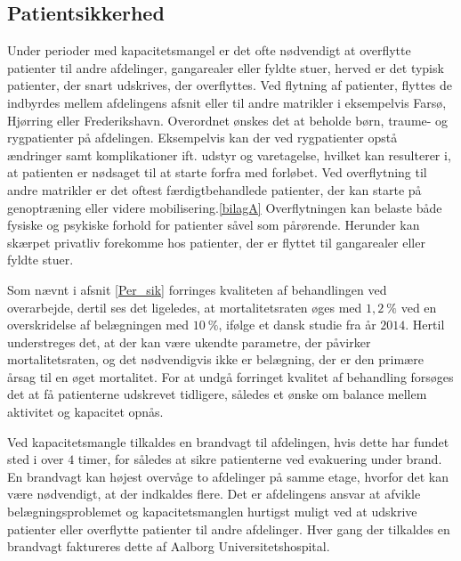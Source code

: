 \subsection{Patientsikkerhed}\label{patsik}
Under perioder med kapacitetsmangel er det ofte nødvendigt at overflytte patienter til andre afdelinger, gangarealer eller fyldte stuer, herved er det typisk patienter, der snart udskrives, der overflyttes. Ved flytning af patienter, flyttes de indbyrdes mellem afdelingens afsnit eller til andre matrikler i eksempelvis Farsø, Hjørring eller Frederikshavn. Overordnet ønskes det at beholde børn, traume- og rygpatienter på afdelingen. Eksempelvis kan der ved rygpatienter opstå ændringer samt komplikationer ift. udstyr og varetagelse, hvilket kan resulterer i, at patienten er nødsaget til at starte forfra med forløbet. Ved overflytning til andre matrikler er det oftest færdigtbehandlede patienter, der kan starte på genoptræning eller videre mobilisering.\ref{bilagA} Overflytningen kan belaste både fysiske og psykiske forhold for patienter såvel som pårørende\cite{Heidmann2014}. Herunder kan skærpet privatliv forekomme hos patienter, der er flyttet til gangarealer eller fyldte stuer\cite{Madsen2014}. 

Som nævnt i afsnit \ref{Per_sik} forringes kvaliteten af behandlingen ved overarbejde, dertil ses det ligeledes, at mortalitetsraten øges med $1,2~\%$ ved en overskridelse af belægningen med $10~\%$, ifølge et dansk studie fra år $2014$\cite{Madsen2014}. Hertil understreges det, at der kan være ukendte parametre, der påvirker mortalitetsraten, og det nødvendigvis ikke er belægning, der er den primære årsag til en øget mortalitet. For at undgå forringet kvalitet af behandling forsøges det at få patienterne udskrevet tidligere, således et ønske om balance mellem aktivitet og kapacitet opnås.


Ved kapacitetsmangle tilkaldes en brandvagt til afdelingen, hvis dette har fundet sted i over $4$ timer, for således at sikre patienterne ved evakuering under brand. En brandvagt kan højest overvåge to afdelinger på samme etage, hvorfor det kan være nødvendigt, at der indkaldes flere. Det er afdelingens ansvar at afvikle belægningsproblemet og kapacitetsmanglen hurtigst muligt ved at udskrive patienter eller overflytte patienter til andre afdelinger. Hver gang der tilkaldes en brandvagt faktureres dette af Aalborg Universitetshospital.\cite{Beredskab2016}


